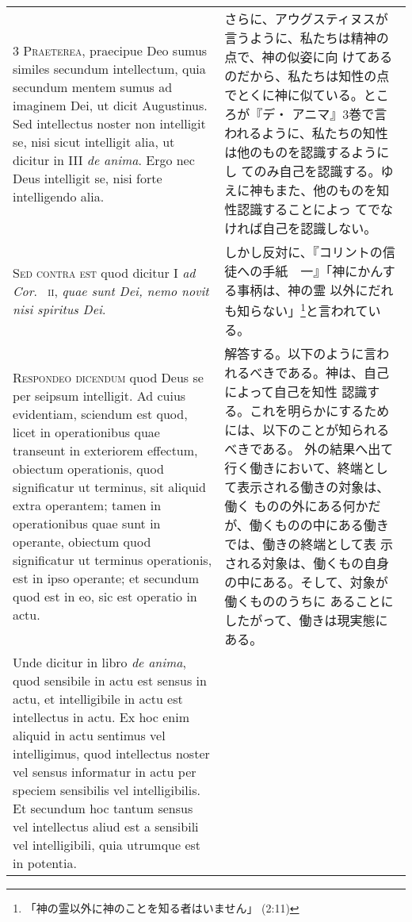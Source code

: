 \documentclass[10pt]{jsarticle} %
\begin{document}
\begin{longtable}{p{21em}p{21em}}
\\


{\scshape 3 Praeterea}, praecipue Deo sumus similes secundum
intellectum, quia secundum mentem sumus ad imaginem Dei, ut dicit
Augustinus. Sed intellectus noster non intelligit se, nisi sicut
intelligit alia, ut dicitur in III {\itshape de anima}. Ergo nec Deus
intelligit se, nisi forte intelligendo alia.


&

さらに、アウグスティヌスが言うように、私たちは精神の点で、神の似姿に向
けてあるのだから、私たちは知性の点でとくに神に似ている。ところが『デ・
アニマ』3巻で言われるように、私たちの知性は他のものを認識するようにし
てのみ自己を認識する。ゆえに神もまた、他のものを知性認識することによっ
てでなければ自己を認識しない。

\\


{\scshape Sed contra est} quod dicitur I {\itshape ad Cor}.~{\scshape
ii}, {\itshape quae sunt Dei, nemo novit nisi spiritus Dei}.

&

しかし反対に、『コリントの信徒への手紙　一』「神にかんする事柄は、神の霊
以外にだれも知らない」\footnote{「神の霊以外に神のことを知る者はいません」
(2:11)}と言われている。

\\

{\scshape Respondeo dicendum} quod Deus se per seipsum
intelligit. Ad cuius evidentiam, sciendum est quod, licet in
operationibus quae transeunt in exteriorem effectum, obiectum
operationis, quod significatur ut terminus, sit aliquid extra operantem;
tamen in operationibus quae sunt in operante, obiectum quod significatur
ut terminus operationis, est in ipso operante; et secundum quod est in
eo, sic est operatio in actu. 

&

解答する。以下のように言われるべきである。神は、自己によって自己を知性
認識する。これを明らかにするためには、以下のことが知られるべきである。
外の結果へ出て行く働きにおいて、終端として表示される働きの対象は、働く
ものの外にある何かだが、働くものの中にある働きでは、働きの終端として表
示される対象は、働くもの自身の中にある。そして、対象が働くもののうちに
あることにしたがって、働きは現実態にある。


\\


Unde dicitur in libro {\itshape de anima}, quod
sensibile in actu est sensus in actu, et intelligibile in actu est
intellectus in actu. Ex hoc enim aliquid in actu sentimus vel
intelligimus, quod intellectus noster vel sensus informatur in actu per
speciem sensibilis vel intelligibilis. Et secundum hoc tantum sensus vel
intellectus aliud est a sensibili vel intelligibili, quia utrumque est
in potentia. 


\end{longtable}
\end{document}
